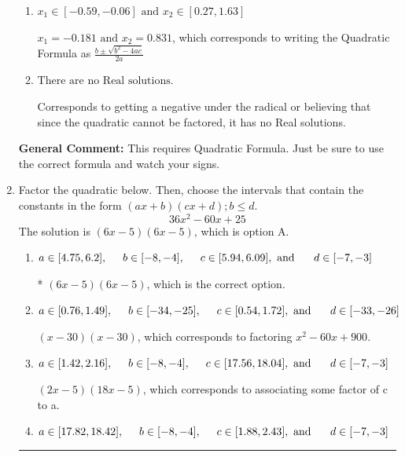 \documentclass{extbook}[14pt]
\newcommand{\litem}[1]{\item #1

\rule{\textwidth}{0.4pt}}
\begin{document}
\begin{enumerate}
{\begin{enumerate}[label=\Alph*.]
 $x_1 = -20.549 \text{ and } x_2 = 19.899$, which corresponds to writing the Quadratic Formula as $-\frac{b}{2a} \pm \sqrt{b^2 - 4ac}$.
\item \( x_1 \in [-0.59, -0.06] \text{ and } x_2 \in [0.27, 1.63] \)

 $x_1 = -0.181 \text{ and } x_2 = 0.831$, which corresponds to writing the Quadratic Formula as $\frac{b \pm \sqrt{b^2 - 4ac}}{2a}$
\item \( \text{There are no Real solutions.} \)

Corresponds to getting a negative under the radical or believing that since the quadratic cannot be factored, it has no Real solutions.
\end{enumerate}

\textbf{General Comment:} This requires Quadratic Formula. Just be sure to use the correct formula and watch your signs.
}
\litem{
Factor the quadratic below. Then, choose the intervals that contain the constants in the form $(ax+b)(cx+d); b \leq d.$
\[ 36x^{2} -60 x + 25 \]The solution is \( (6x -5)(6x -5) \), which is option A.\begin{enumerate}[label=\Alph*.]
\item \( a \in [4.75, 6.2], \hspace*{5mm} b \in [-8, -4], \hspace*{5mm} c \in [5.94, 6.09], \text{ and } \hspace*{5mm} d \in [-7, -3] \)

* $(6x -5)(6x -5)$, which is the correct option.
\item \( a \in [0.76, 1.49], \hspace*{5mm} b \in [-34, -25], \hspace*{5mm} c \in [0.54, 1.72], \text{ and } \hspace*{5mm} d \in [-33, -26] \)

 $(x -30)(x -30)$, which corresponds to factoring $x^{2} -60 x + 900$.
\item \( a \in [1.42, 2.16], \hspace*{5mm} b \in [-8, -4], \hspace*{5mm} c \in [17.56, 18.04], \text{ and } \hspace*{5mm} d \in [-7, -3] \)

 $(2x -5)(18x -5)$, which corresponds to associating some factor of c to a.
\item \( a \in [17.82, 18.42], \hspace*{5mm} b \in [-8, -4], \hspace*{5mm} c \in [1.88, 2.43], \text{ and } \hspace*{5mm} d \in [-7, -3] \)


\end{enumerate}}
\end{enumerate}
\end{document}
